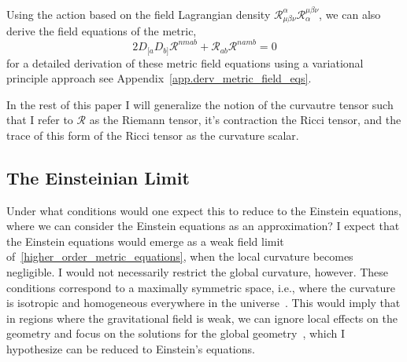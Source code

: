 \documentclass[aps,prd,preprint]{revtex4-1}
\begin{document}
Using the action based on the field Lagrangian density $\mathcal{R}^\alpha_{\mu\beta\nu}\mathcal{R}_\alpha^{\mu\beta\nu}$, we can also derive the field equations of the metric,
\begin{equation}\label{higher_order_metric_equations}
    2 D_{[a} D_{b]} \mathcal{R}^{nmab} + \mathcal{R}_{ab} \mathcal{R}^{namb} = 0
\end{equation}
for a detailed derivation of these metric field equations using a variational principle approach see Appendix~\ref{app.derv_metric_field_eqs}.

In the rest of this paper I will generalize the notion of the curvautre tensor such that I refer to $\mathcal{R}$ as the Riemann tensor, it's contraction the Ricci tensor, and the trace of this form of the Ricci tensor as the curvature scalar.

\subsection*{The Einsteinian Limit}
Under what conditions would one expect this to reduce to the Einstein equations, where we can consider the Einstein equations as an approximation? I expect that the Einstein equations would emerge as a weak field limit of~\eqref{higher_order_metric_equations}, when the local curvature becomes negligible. I would not necessarily restrict the global curvature, however. These conditions correspond to a maximally symmetric space, i.e., where the curvature is isotropic and homogeneous everywhere in the universe~\cite{duggal_2013,emparan_2002,jizba_2020}. This would imply that in regions where the gravitational field is weak, we can ignore local effects on the geometry and focus on the solutions for the global geometry~\cite{stephani_2009}, which I hypothesize can be reduced to Einstein's equations.
\end{document}
